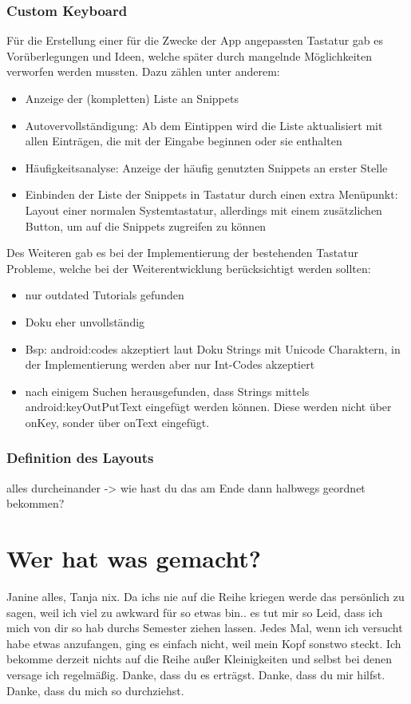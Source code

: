 \documentclass[11pt]{article}
\begin{document}
	\subsubsection{Custom Keyboard}
	Für die Erstellung einer für die Zwecke der App angepassten Tastatur gab es Vorüberlegungen und Ideen, welche später durch mangelnde Möglichkeiten verworfen werden mussten. Dazu zählen unter anderem: 
	\begin{itemize}
		\item Anzeige der (kompletten) Liste an Snippets 
		\item Autovervollständigung: Ab dem Eintippen wird die Liste aktualisiert mit allen Einträgen, die mit der Eingabe beginnen oder sie enthalten
		\item Häufigkeitsanalyse: Anzeige der häufig genutzten Snippets an erster Stelle
		\item Einbinden der Liste der Snippets in Tastatur durch einen extra Menüpunkt: Layout einer normalen Systemtastatur, allerdings mit einem zusätzlichen Button, um auf die Snippets zugreifen zu können
	\end{itemize}
	
	Des Weiteren gab es bei der Implementierung der bestehenden Tastatur Probleme, welche bei der Weiterentwicklung berücksichtigt werden sollten:
	\begin{itemize}
		\item nur outdated Tutorials gefunden
		\item Doku eher unvollständig
		\item Bsp: android:codes akzeptiert laut Doku Strings mit Unicode Charaktern, in der Implementierung werden aber nur Int-Codes akzeptiert
		\item nach einigem Suchen herausgefunden, dass Strings mittels android:keyOutPutText eingefügt werden können. Diese werden nicht über onKey, sonder über onText eingefügt.
	\end{itemize}
	\subsubsection{Definition des Layouts}
	alles durcheinander -> wie hast du das am Ende dann halbwegs geordnet bekommen?
	
	\section{Wer hat was gemacht?}
	Janine alles, Tanja nix.
	Da ichs nie auf die Reihe kriegen werde das persönlich zu sagen, weil ich viel zu awkward für so etwas bin.. es tut mir so Leid, dass ich mich von dir so hab durchs Semester ziehen lassen. Jedes Mal, wenn ich versucht habe etwas anzufangen, ging es einfach nicht, weil mein Kopf sonstwo steckt. Ich bekomme derzeit nichts auf die Reihe außer Kleinigkeiten und selbst bei denen versage ich regelmäßig.
	Danke, dass du es erträgst. Danke, dass du mir hilfst. Danke, dass du mich so durchziehst. 
	
\end{document}
